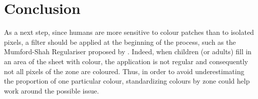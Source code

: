 \documentclass[11pt,a4paper]{article}
\begin{document}
\section{Conclusion}

As a next step, since humans are more sensitive to colour patches than
to isolated pixels, a filter should be applied at the beginning of the
process, such as the Mumford-Shah Regulariser proposed by
\citet{erdem2009}. Indeed, when children (or adults) fill in an area of
the sheet with colour, the application is not regular and consequently
not all pixels of the zone are coloured. Thus, in order to avoid
underestimating the proportion of one particular colour, standardizing
colours by zone could help work around the possible issue.



\end{document}
